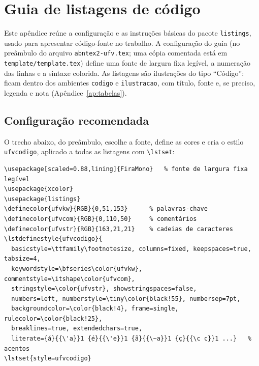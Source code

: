 


\chapter{Guia de listagens de código}\label{ap:listagens}

Este apêndice reúne a configuração e as instruções básicas do pacote \texttt{listings},
usado para apresentar código-fonte no trabalho. A configuração do guia (no preâmbulo do
arquivo \texttt{abntex2-ufv.tex}; uma cópia comentada está em \texttt{template/template.tex})
define uma fonte de largura fixa legível, a numeração das linhas e a sintaxe colorida. As
listagens são ilustrações do tipo ``Código'': ficam dentro dos ambientes \texttt{codigo} e
\texttt{ilustracao}, com título, fonte e, se preciso, legenda e nota
(Apêndice~\ref{ap:tabelas}).

\section{Configuração recomendada}\label{sec:lst-config}

O trecho abaixo, do preâmbulo, escolhe a fonte, define as cores e cria o estilo
\texttt{ufvcodigo}, aplicado a todas as listagens com \texttt{\textbackslash lstset}:

\begin{lstlisting}[style=exemplo, language={[LaTeX]TeX}]
\usepackage[scaled=0.88,lining]{FiraMono}   % fonte de largura fixa legível
\usepackage{xcolor}
\usepackage{listings}
\definecolor{ufvkw}{RGB}{0,51,153}      % palavras-chave
\definecolor{ufvcom}{RGB}{0,110,50}     % comentários
\definecolor{ufvstr}{RGB}{163,21,21}    % cadeias de caracteres
\lstdefinestyle{ufvcodigo}{
  basicstyle=\ttfamily\footnotesize, columns=fixed, keepspaces=true, tabsize=4,
  keywordstyle=\bfseries\color{ufvkw}, commentstyle=\itshape\color{ufvcom},
  stringstyle=\color{ufvstr}, showstringspaces=false,
  numbers=left, numberstyle=\tiny\color{black!55}, numbersep=7pt,
  backgroundcolor=\color{black!4}, frame=single, rulecolor=\color{black!25},
  breaklines=true, extendedchars=true,
  literate={á}{{\'a}}1 {é}{{\'e}}1 {ã}{{\~a}}1 {ç}{{\c c}}1 ...}   % acentos
\lstset{style=ufvcodigo}
\end{lstlisting}

